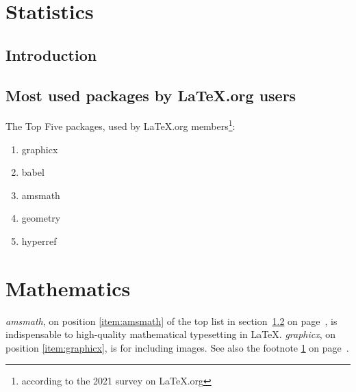 \documentclass{book}
\begin{document}
\chapter{Statistics}
\section{Introduction}
\newpage
\section{Most used packages by LaTeX.org users}
\label{sec:packages}
The Top Five packages, used by LaTeX.org
members\footnote{according to the 2021 survey on
LaTeX.org\label{fn:project}}:
\begin{enumerate}
  \item graphicx\label{item:graphicx}
  \item babel
  \item amsmath\label{item:amsmath}
  \item geometry
  \item hyperref
\end{enumerate}
\chapter{Mathematics}
\emph{amsmath}, on position \ref{item:amsmath} of the top list
in section~\ref{sec:packages} on page~\pageref{sec:packages},
is indispensable to high-quality mathematical typesetting in
\LaTeX. \emph{graphicx}, on position \ref{item:graphicx},
is for including images. See also the footnote \ref{fn:project}
on page~\pageref{fn:project}.
\end{document}
